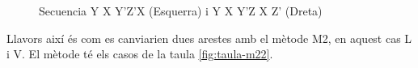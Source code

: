 \begin{figure}[h!]
    \centering
    \begin{subfigure}
        \centering\RubikCubeSolvedWY
    \end{subfigure}
    \begin{subfigure}
        \centering\RubikCubeSolvedWY
    \end{subfigure}
    \caption{Secuencia Y X Y'Z'X (Esquerra) i Y X Y'Z X Z' (Dreta)}
\end{figure}

Llavors així és com es canviarien dues arestes amb el mètode M2, en aquest cas L i V. El mètode té els casos de la taula \ref{fig:taula-m22}.

